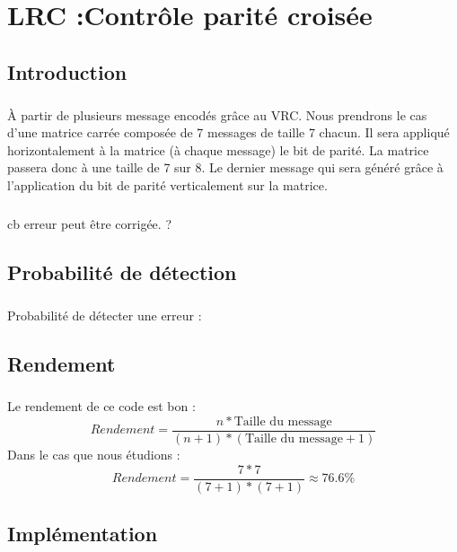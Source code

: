 
\chapter{LRC :Contrôle parité croisée}

    \section{Introduction}

        \paragraph{}
À partir de plusieurs message encodés grâce au VRC.
Nous prendrons le cas d'une matrice carrée composée de 7 messages de taille 7 chacun.
Il sera appliqué horizontalement à la matrice (à chaque message) le bit de parité.
La matrice passera donc à une taille de 7 sur 8.
Le dernier message qui sera généré grâce à l'application du bit de parité verticalement sur la matrice.
        \paragraph{}
cb erreur peut être corrigée. ?


    \section{Probabilité de détection}

        \paragraph{}
Probabilité de détecter une erreur :


    \section{Rendement}

        \paragraph{}
Le rendement de ce code est bon :
\[  Rendement = \frac{n*\text{Taille du message}}{(n+1)*(\text{Taille du message}+1)} \]
Dans le cas que nous étudions :
\[  Rendement = \frac{7*7}{(7+1)*(7+1)} \approx 76.6\% \]


    \section{Implémentation}

        \paragraph{}
